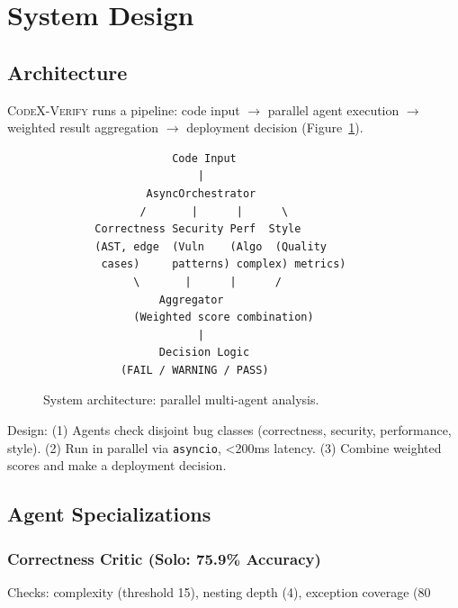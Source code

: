 \documentclass[10pt,twocolumn]{article}
\begin{document}

\section{System Design}

\subsection{Architecture}

\textsc{CodeX-Verify} runs a pipeline: code input $\to$ parallel agent execution $\to$ weighted result aggregation $\to$ deployment decision (Figure~\ref{fig:architecture}).

\begin{figure}[t]
\centering
\small
\begin{verbatim}
                    Code Input
                        |
                AsyncOrchestrator
               /       |      |      \
        Correctness Security Perf  Style
        (AST, edge  (Vuln    (Algo  (Quality
         cases)     patterns) complex) metrics)
              \       |      |      /
                  Aggregator
              (Weighted score combination)
                        |
                  Decision Logic
            (FAIL / WARNING / PASS)
\end{verbatim}
\caption{System architecture: parallel multi-agent analysis.}
\label{fig:architecture}
\end{figure}

Design: (1) Agents check disjoint bug classes (correctness, security, performance, style). (2) Run in parallel via \texttt{asyncio}, <200ms latency. (3) Combine weighted scores and make a deployment decision.

\subsection{Agent Specializations}

\subsubsection{Correctness Critic (Solo: 75.9\% Accuracy)}

Checks: complexity (threshold 15), nesting depth (4), exception coverage (80%
\end{document}
